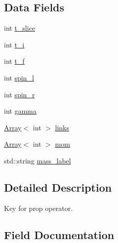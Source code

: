 \subsection*{Data Fields}
\begin{DoxyCompactItemize}
\item 
int \mbox{\hyperlink{structHadron_1_1KeyGenPropElementalOperator__t_aa25e47bfba87915da35d3379689bb2c9}{t\+\_\+slice}}
\item 
int \mbox{\hyperlink{structHadron_1_1KeyGenPropElementalOperator__t_af65e8194e27bc10d25dc614a908e1da4}{t\+\_\+i}}
\item 
int \mbox{\hyperlink{structHadron_1_1KeyGenPropElementalOperator__t_a75ddf67523a15959b02c924bb44ed26d}{t\+\_\+f}}
\item 
int \mbox{\hyperlink{structHadron_1_1KeyGenPropElementalOperator__t_a9a49b94077ea543ff7121304ae56ce31}{spin\+\_\+l}}
\item 
int \mbox{\hyperlink{structHadron_1_1KeyGenPropElementalOperator__t_a91cfd6b0736fc619ba2e8914443bf58d}{spin\+\_\+r}}
\item 
int \mbox{\hyperlink{structHadron_1_1KeyGenPropElementalOperator__t_a93d5e3c8af8090090ceb87b24adf25f5}{gamma}}
\item 
\mbox{\hyperlink{classXMLArray_1_1Array}{Array}}$<$ int $>$ \mbox{\hyperlink{structHadron_1_1KeyGenPropElementalOperator__t_abf56b170a25a56bb6a63354f69432462}{links}}
\item 
\mbox{\hyperlink{classXMLArray_1_1Array}{Array}}$<$ int $>$ \mbox{\hyperlink{structHadron_1_1KeyGenPropElementalOperator__t_a017cae42567bd62acbadfc719c039593}{mom}}
\item 
std\+::string \mbox{\hyperlink{structHadron_1_1KeyGenPropElementalOperator__t_a32e434a5c67378329a1ac9f313cec074}{mass\+\_\+label}}
\end{DoxyCompactItemize}


\subsection{Detailed Description}
Key for prop operator. 

\subsection{Field Documentation}
\mbox{\label{structHadron_1_1KeyGenPropElementalOperator__t_a93d5e3c8af8090090ceb87b24adf25f5}} 
